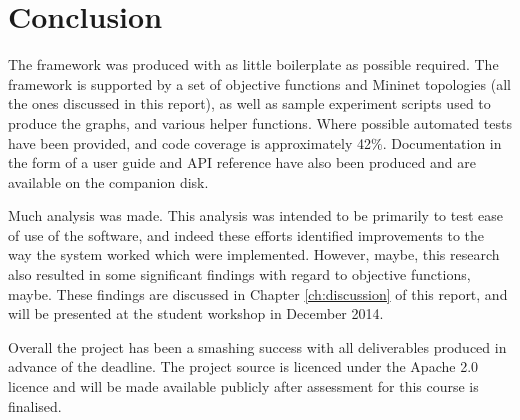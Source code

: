 \chapter{Conclusion}
\label{ch:conclusion}

The framework was produced with as little boilerplate as possible required. The framework is supported by a set of objective functions and Mininet topologies (all the ones discussed in this report), as well as sample experiment scripts used to produce the graphs, and various helper functions. Where possible automated tests have been provided, and code coverage is approximately 42\%. Documentation in the form of a user guide and API reference have also been produced and are available on the companion disk.

Much analysis was made. This analysis was intended to be primarily to test ease of use of the software, and indeed these efforts identified improvements to the way the system worked which were implemented. However, maybe, this research also resulted in some significant findings with regard to objective functions, maybe. These findings are discussed in Chapter \ref{ch:discussion} of this report, and will be presented at the student workshop in December 2014.

Overall the project has been a smashing success with all deliverables produced in advance of the deadline. The project source is licenced under the Apache 2.0 licence and will be made available publicly after assessment for this course is finalised.
